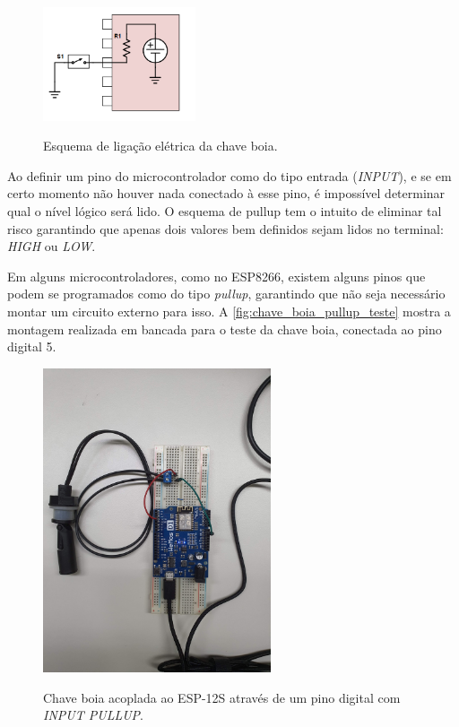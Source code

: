 \begin{figure}[H]
	\centering
	\caption{Esquema de ligação elétrica da chave boia.}
	\includegraphics[width=0.4\textwidth]{figuras/pullup.png}
	\label{fig:chave_boia_pullup}
\end{figure}

 Ao definir um pino do microcontrolador como do tipo entrada (\textit{INPUT}), e se em certo momento não houver nada conectado à esse pino, é impossível determinar qual o nível lógico será lido. O esquema de pullup tem o intuito de eliminar tal risco garantindo que apenas dois valores bem definidos sejam lidos no terminal: \textit{HIGH} ou \textit{LOW}.
 
 Em alguns microcontroladores, como no ESP8266, existem alguns pinos que podem se programados como do tipo \textit{pullup}, garantindo que não seja necessário montar um circuito externo para isso. A \autoref{fig:chave_boia_pullup_teste} mostra a montagem realizada em bancada para o teste da chave boia, conectada ao pino digital 5. 
 
 \begin{figure}[H]
 	\centering
 	\caption{Chave boia acoplada ao ESP-12S através de um pino digital com \textit{INPUT PULLUP}.}
 	\includegraphics[width=0.6\textwidth]{figuras/teste_chave_boia.jpg}
 	\label{fig:chave_boia_pullup_teste}
 \end{figure}
 



